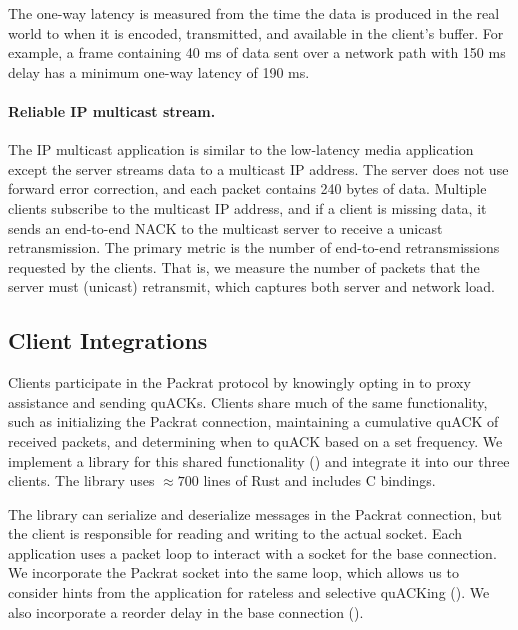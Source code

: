 The one-way latency is measured from the time the data is produced in the real
world to when it is encoded, transmitted, and available in the client's
buffer. For example, a frame containing 40 ms of data sent over a network path
with 150 ms delay has a minimum one-way latency of 190 ms.

\paragraph{Reliable IP multicast stream.}

The IP multicast application is similar to the low-latency media application
except the server streams data to a multicast IP address. The server does not
use forward error correction, and each packet contains 240 bytes of data. Multiple clients
subscribe to the multicast IP address, and if a client is missing data,
it sends an end-to-end NACK to the
multicast server to receive a unicast retransmission.
The primary metric is the number of end-to-end retransmissions requested by
the clients. That is, we measure the number of packets that the server
must (unicast) retransmit, which captures both server and network load.

\subsection{Client Integrations}



Clients participate in the Packrat protocol by knowingly opting in to proxy
assistance and sending quACKs. Clients share much of the same functionality,
such as initializing the Packrat connection, maintaining a cumulative quACK of
received packets, and determining when to quACK based on a set frequency. We
implement a library for this shared functionality ()
and integrate it into our three clients.
The library uses $\approx\!700$ lines of Rust and includes C bindings.

The library can serialize and deserialize messages in the Packrat connection, but
the client is responsible for reading and writing to the actual socket. Each
application uses a packet loop to interact with a socket for the base
connection. We incorporate the Packrat socket into the same loop, which allows us to
consider hints from the application for rateless and selective quACKing
(). We also incorporate a reorder delay in the base
connection ().

